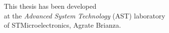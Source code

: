 \vspace{17cm}



\begin{center}
This thesis has been developed\\
at the \emph{Advanced System Technology} (AST) laboratory\\
of STMicroelectronics, Agrate Brianza.%
\end{center}